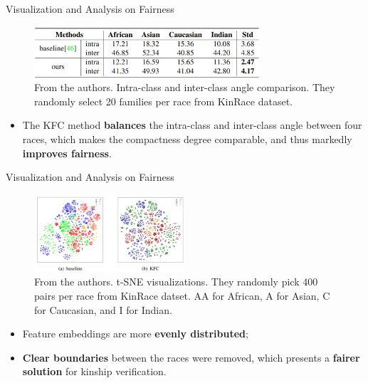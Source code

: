 \documentclass[aspectratio=169,xcolor=dvipsnames]{beamer}
\begin{document}

\begin{frame}{Visualization and Analysis on Fairness}
    \begin{figure}
        \centering
        \includegraphics[width=0.75\textwidth]{imgs/11_Table7.png}
        \caption{From the authors. Intra-class and inter-class angle comparison. They randomly select 20 families per race from KinRace dataset.}
        \label{fig:kfc-comparison-angle}
    \end{figure}
    \begin{itemize}
        \item The KFC method \textbf{balances} the intra-class and inter-class angle between four races, which makes the compactness degree comparable, and thus markedly \textbf{improves fairness}.
    \end{itemize}
\end{frame}


\begin{frame}{Visualization and Analysis on Fairness}
    \begin{figure}
        \centering
        \includegraphics[width=0.5\textwidth]{imgs/12_Figure5.png}
        \caption{From the authors. t-SNE visualizations. They randomly pick 400 pairs per race from KinRace datset. AA for African, A for Asian, C for Caucasian, and I for Indian.}
        \label{fig:kfc-tsne-races}
    \end{figure}
    \begin{itemize}
        \item Feature embeddings are more \textbf{evenly distributed}; 
        \item \textbf{Clear boundaries} between the races were removed, which presents a \textbf{fairer solution} for kinship verification. 
    \end{itemize}
\end{frame}
\end{document}
